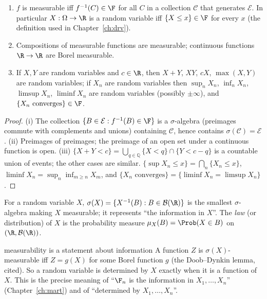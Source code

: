 \begin{proposition}\label{prop:measurable}
\begin{enumerate}[label=(\roman*)]
\item $f$ is measurable iff $f^{-1}(C)\in\F$ for all $C$ in a collection $\mathcal C$ that
generates $\mathcal E$. In particular $X:\Omega\to\R$ is a random variable iff
$\{X\le x\}\in\F$ for every $x$ (the definition used in Chapter~\ref{ch:drv}).
\item Compositions of measurable functions are measurable; continuous functions
$\R\to\R$ are Borel measurable.
\item If $X,Y$ are random variables and $c\in\R$, then $X+Y$, $XY$, $cX$, $\max(X,Y)$ are
random variables; if $X_n$ are random variables then $\sup_nX_n$, $\inf_nX_n$,
$\limsup X_n$, $\liminf X_n$ are random variables (possibly $\pm\infty$), and
$\{X_n\text{ converges}\}\in\F$.
\end{enumerate}
\end{proposition}
\begin{proof}
(i) The collection $\{B\in\mathcal E:f^{-1}(B)\in\F\}$ is a $\sigma$-algebra (preimages
commute with complements and unions) containing $\mathcal C$, hence contains
$\sigma(\mathcal C)=\mathcal E$. (ii) Preimages of preimages; the preimage of an open set under
a continuous function is open. (iii) $\{X+Y<c\}=\bigcup_{q\in\mathbb Q}\{X<q\}\cap\{Y<c-q\}$ is a
countable union of events; the other cases are similar. $\{\sup X_n\le x\}=\bigcap_n\{X_n\le x\}$,
$\liminf X_n=\sup_n\inf_{m\ge n}X_m$, and $\{X_n\text{ converges}\}=\{\liminf X_n=\limsup X_n\}$.
\end{proof}

\begin{definition}
For a random variable $X$, $\sigma(X)=\{X^{-1}(B):B\in\mathcal B(\R)\}$ is the smallest
$\sigma$-algebra making $X$ measurable; it represents ``the information in $X$''. The
\emph{law} (or distribution) of $X$ is the probability measure
$\mu_X(B)=\Prob(X\in B)$ on $(\R,\mathcal B(\R))$.
\end{definition}

\begin{nuance}{measurability is a statement about information}
A function $Z$ is $\sigma(X)$-measurable iff $Z=g(X)$ for some Borel function $g$ (the
Doob--Dynkin lemma, cited). So a random variable is determined by $X$ exactly when it is
a function of $X$. This is the precise meaning of ``$\F_n$ is the information in
$X_1,\dots,X_n$'' (Chapter~\ref{ch:mart}) and of ``determined by $X_1,\dots,X_n$''.
\end{nuance}

